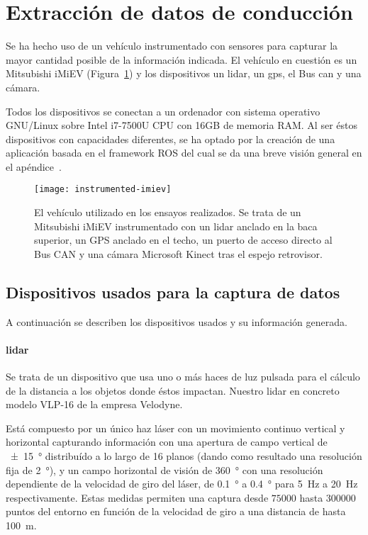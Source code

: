 \section{Extracción de datos de conducción}

Se ha hecho uso de un vehículo instrumentado con sensores para capturar la mayor cantidad posible de la información indicada. El vehículo en cuestión es un Mitsubishi iMiEV (Figura~\ref{fig:instrumented-imiev}) y los dispositivos un \acrfull{lidar}, un \gls{gps}, el Bus \Acrfull{can} y una cámara.

Todos los dispositivos se conectan a un ordenador con sistema operativo GNU/Linux sobre Intel i7-7500U CPU con 16GB de memoria RAM. Al ser éstos dispositivos con capacidades diferentes, se ha optado por la creación de una aplicación basada en el framework ROS del cual se da una breve visión general en el apéndice~.

\begin{figure}[t]
	\centering
	\texttt{[image: instrumented-imiev]}
	\caption[Vehículo instrumentado utilizado en los ensayos]{El vehículo utilizado en los ensayos realizados. Se trata de un Mitsubishi iMiEV instrumentado con un \acrshort{lidar} anclado en la baca superior, un GPS anclado en el techo, un puerto de acceso directo al Bus CAN y una cámara Microsoft Kinect tras el espejo retrovisor.}
	\label{fig:instrumented-imiev}
\end{figure}

\subsection{Dispositivos usados para la captura de datos}

A continuación se describen los dispositivos usados y su información generada.

\paragraph{\acrshort{lidar}}

Se trata de un dispositivo que usa uno o más haces de luz pulsada para el cálculo de la distancia a los objetos donde éstos impactan. Nuestro \acrshort{lidar} en concreto modelo VLP-16 de la empresa Velodyne.

Está compuesto por un único haz láser con un movimiento continuo vertical y horizontal capturando información con una apertura de campo vertical de \SI{\pm15}{\degree} distribuído a lo largo de 16 planos (dando como resultado una resolución fija de \SI{2}{\degree}), y un campo horizontal de visión de \SI{360}{\degree} con una resolución dependiente de la velocidad de giro del láser, de \SI{0.1}{\degree} a \SI{0.4}{\degree} para \SI{5}{\Hz} a \SI{20}{\Hz} respectivamente. Estas medidas permiten una captura desde $75000$ hasta $300000$ puntos del entorno en función de la velocidad de giro a una distancia de hasta \SI{100}{\meter}.

